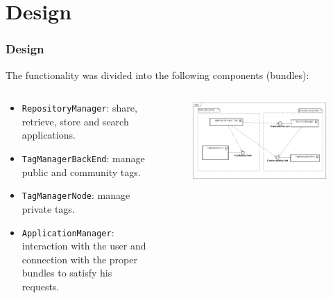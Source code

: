 \section{Design}

\begin{frame}

\frametitle{Design} 
The functionality was divided into the following components (bundles):

\begin{columns}

\begin{column}{7cm}


	\begin{itemize}
		\item \texttt{RepositoryManager}: share, retrieve, store and search
		applications.
	          
		\item \texttt{TagManagerBackEnd}: manage public and community tags.
	          
		\item \texttt{TagManagerNode}: manage private tags.
	          
		\item \texttt{ApplicationManager}: interaction with the user and connection
		with the proper bundles to satisfy his requests.
		
	      
	\end{itemize}
	
		\end{column}
	
		\begin{column}{6cm}
	    
			\begin{figure}
			 	\includegraphics[scale=0.18]{img/BundlesComponentsDiagram.png}
			\end{figure}
	    
	    \end{column}
	
\end{columns}

\end{frame}

